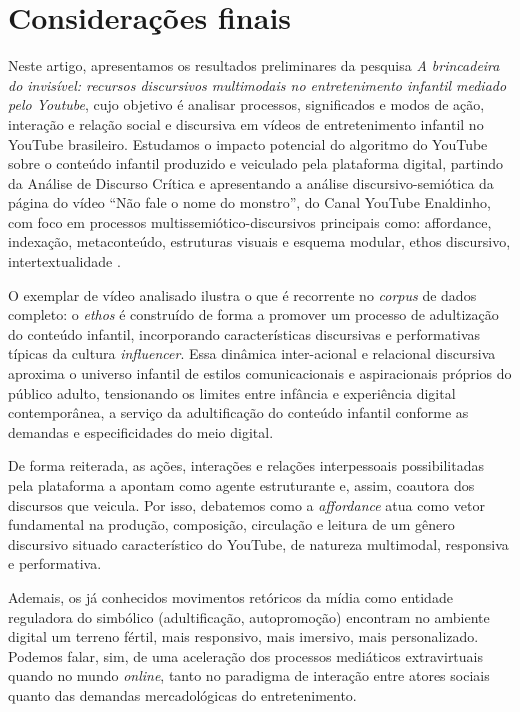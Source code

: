 \documentclass[portuguese]{textolivre}
\begin{document}
\section{Considerações finais}\label{sec-organizacao}
Neste artigo, apresentamos os resultados preliminares da pesquisa \textit{A brincadeira do invisível: recursos discursivos multimodais no entretenimento infantil mediado pelo Youtube}, cujo objetivo é analisar processos, significados e modos de ação, interação e relação social e discursiva em vídeos de entretenimento infantil no YouTube brasileiro. Estudamos o impacto potencial do algoritmo do YouTube sobre o conteúdo infantil produzido e veiculado pela plataforma digital, partindo da Análise de Discurso Crítica \cite{Fairclough2003AnalysingDiscourse,VieiraResende2016AnaliseDiscursoCritica,Vieira2024Decolonial} e apresentando a análise discursivo-semiótica da página do vídeo “Não fale o nome do monstro”, do Canal YouTube Enaldinho, com foco em processos multissemiótico-discursivos principais como: affordance, indexação, metaconteúdo, estruturas visuais e esquema modular, ethos discursivo, intertextualidade \cite{Benson2016DiscourseYouTube,ColetivaCiborga2022EtnografiaDigital,Fairclough2003AnalysingDiscourse,KressVanLeeuwen2020ReadingImages,Maingueneau2020GenerosWeb}.

O exemplar de vídeo analisado ilustra o que é recorrente no \textit{corpus} de dados completo: o \textit{ethos} é construído de forma a promover um processo de adultização do conteúdo infantil, incorporando características discursivas e performativas típicas da cultura \textit{influencer}. Essa dinâmica inter-acional e relacional discursiva aproxima o universo infantil de estilos comunicacionais e aspiracionais próprios do público adulto, tensionando os limites entre infância e experiência digital contemporânea, a serviço da adultificação do conteúdo infantil conforme as demandas e especificidades do meio digital.

De forma reiterada, as ações, interações e relações interpessoais possibilitadas pela plataforma a apontam como agente estruturante e, assim, coautora dos discursos que veicula. Por isso, debatemos como a \textit{affordance} atua como vetor fundamental na produção, composição, circulação e leitura de um gênero discursivo situado característico do YouTube, de natureza multimodal, responsiva e performativa.

Ademais, os já conhecidos movimentos retóricos da mídia como entidade reguladora do simbólico (adultificação, autopromoção) encontram no ambiente digital um terreno fértil, mais responsivo, mais imersivo, mais personalizado. Podemos falar, sim, de uma aceleração dos processos mediáticos extravirtuais quando no mundo \textit{online}, tanto no paradigma de interação entre atores sociais quanto das demandas mercadológicas do entretenimento.
\end{document}
